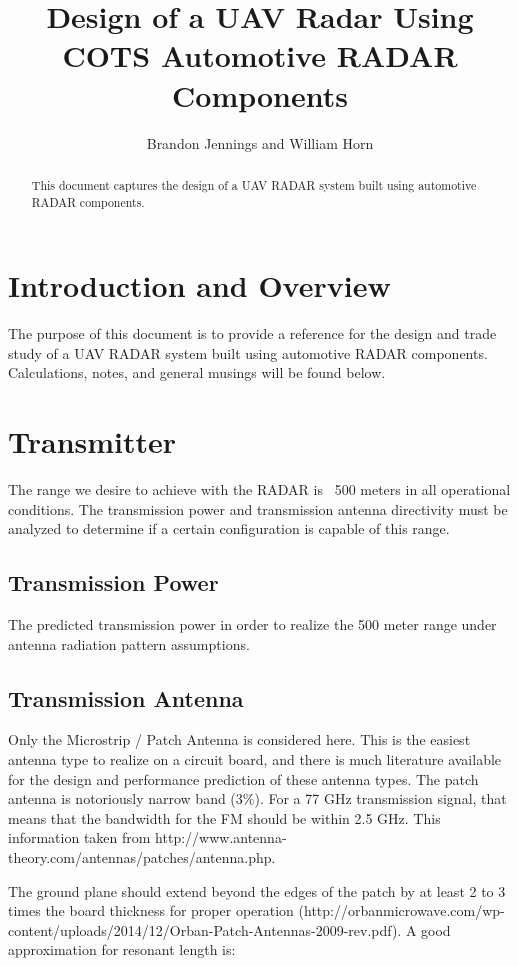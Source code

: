 \documentclass[]{article}
\title{Design of a UAV Radar Using COTS Automotive RADAR Components}
\author{Brandon Jennings and William Horn}
\begin{document}
\maketitle

\begin{abstract}
This document captures the design of a UAV RADAR system built using automotive RADAR components.
\end{abstract}

\section{Introduction and Overview}
The purpose of this document is to provide a reference for the design and trade study of a UAV RADAR system built using automotive RADAR components. Calculations, notes, and general musings will be found below.

\section{Transmitter}

The range we desire to achieve with the RADAR is ~500 meters in all operational conditions. The transmission power and transmission antenna directivity must be analyzed to determine if a certain configuration is capable of this range.

\subsection{Transmission Power} 

The predicted transmission power in order to realize the 500 meter range under antenna radiation pattern assumptions.

\subsection{Transmission Antenna}

Only the Microstrip / Patch Antenna is considered here. This is the easiest antenna type to realize on a circuit board, and there is much literature available for the design and performance prediction of these antenna types. The patch antenna is notoriously narrow band (3\%). For a 77 GHz transmission signal, that means that the bandwidth for the FM should be within 2.5 GHz. This information taken from http://www.antenna-theory.com/antennas/patches/antenna.php. 

The ground plane should extend beyond the edges of the patch by at least 2 to 3 times the board thickness for proper operation (http://orbanmicrowave.com/wp-content/uploads/2014/12/Orban-Patch-Antennas-2009-rev.pdf). A good approximation for resonant length is:
\end{document}

